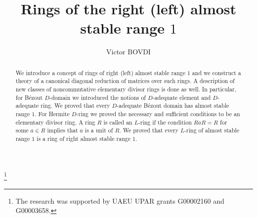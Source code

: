 \documentclass[12pt,a4paper, reqno]{amsart}
\begin{document}
\title[almost stable range $1$]{Rings of the right (left) almost stable range $1$}


\author{Victor BOVDI}
\address[\texttt{V.Bovdi}]
{United Arab Emirates University, Al Ain, UAE}



\author{ }
\address[\texttt{B.Zabavsky}]
{Department of Mechanics and Mathematics, Ivan Franko National University\\ Lviv, 79000, Ukraine}


\thanks{The research was supported by UAEU UPAR grants G00002160 and  G00003658.}



\maketitle


\begin{abstract}
{We introduce a concept of  rings of right (left) almost stable range $1$ and  we construct  a theory of  a canonical diagonal reduction of matrices over such rings. A description of  new classes of noncommutative elementary divisor rings is done as well. In particular, for B\'ezout $D$-domain  we introduced the notions of $D$-adequate element and $D$-adequate ring. We proved that every $D$-adequate  B\'ezout domain has almost stable range $1$. For Hermite $D$-ring we proved the necessary and sufficient conditions to be an elementary divisor ring. A ring $R$ is called an $L$-ring if the condition $RaR = R$ for some  $a\in R$ implies that $a$ is a unit  of $R$. We proved  that every $L$-ring of almost stable range $1$ is a ring of right almost stable range $1$.}
\end{abstract}









\bigskip
\end{document}
